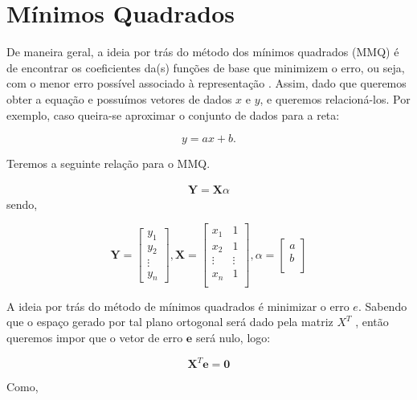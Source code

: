 \section{Mínimos Quadrados}
\label{sec:MMQ}
De maneira geral, a ideia por trás do método dos mínimos quadrados (MMQ)  é de encontrar os coeficientes da(s) funções de base que minimizem o erro, ou seja, com o menor erro possível associado à representação \cite{MMQ}. Assim, dado que queremos obter a equação e possuímos vetores de dados $x$ e $y$, e queremos relacioná-los. Por exemplo, caso queira-se aproximar o conjunto de dados para a reta:

\begin{equation}
    y = ax + b.
    \label{eq:pol1}
\end{equation}

Teremos a seguinte relação para o MMQ.

\begin{align*}
    \textbf{Y} = \textbf{X}\alpha
\end{align*}
sendo,

\begin{equation*}
    \textbf{Y} =
    \begin{bmatrix}
     y_1\\
     y_2\\
     \vdots\\
     y_n
    \end{bmatrix},
    \textbf{X} = 
    \begin{bmatrix}
        x_1 & 1\\
        x_2 & 1\\
        \vdots & \vdots\\
        x_n & 1\\
    \end{bmatrix},
    \alpha =
    \begin{bmatrix}
        a\\
        b\\
    \end{bmatrix}
\end{equation*}

A ideia por trás do método de mínimos quadrados é minimizar o erro $e$. Sabendo que o espaço gerado por tal plano ortogonal será dado pela matriz $X^T$ , então queremos impor que o vetor
de erro $\textbf{e}$ será nulo, logo:

\[\textbf{X}^T\textbf{e} = \textbf{0}\]

Como,

